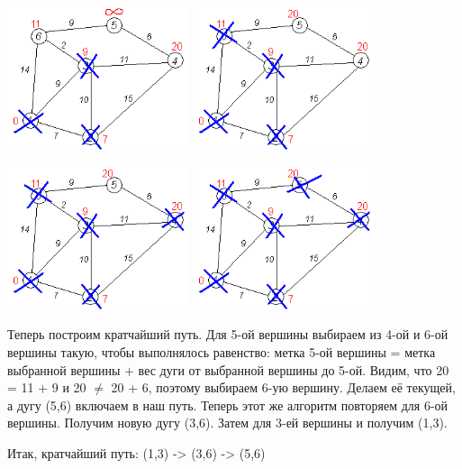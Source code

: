 \documentclass[12pt, a4paper, oneside]{article}
\theoremstyle{plain} %
\theoremstyle{definition}
\begin{document}
\includegraphics[width=0.4\textwidth]{Dijkstra/Dijkstra_graph11.png}
\includegraphics[width=0.4\textwidth]{Dijkstra/Dijkstra_graph12.png}

\includegraphics[width=0.4\textwidth]{Dijkstra/Dijkstra_graph13.png}
\includegraphics[width=0.4\textwidth]{Dijkstra/Dijkstra_graph14.png}

Теперь построим кратчайший путь. Для 5-ой вершины выбираем из 4-ой и 6-ой вершины такую, чтобы выполнялось равенство: метка 5-ой вершины = метка выбранной вершины + вес дуги от выбранной вершины до 5-ой. Видим, что 20 = 11 + 9 и 20 $\neq$ 20 + 6, поэтому выбираем 6-ую вершину. Делаем её текущей, а дугу (5,6) включаем в наш путь. Теперь этот же алгоритм повторяем для 6-ой вершины. Получим новую дугу (3,6). Затем для 3-ей вершины и получим (1,3).

Итак, кратчайший путь: (1,3) -> (3,6) -> (5,6)
\end{document}
